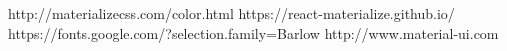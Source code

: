 http://materializecss.com/color.html
https://react-materialize.github.io/
https://fonts.google.com/?selection.family=Barlow   
http://www.material-ui.com
